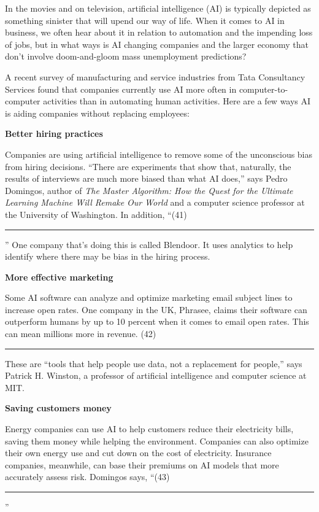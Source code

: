 \documentclass[UTF8,11pt]{ctexart}
\begin{document}
In the movies and on television, artificial intelligence (AI) is typically depicted as something sinister that will upend our way of life. When it comes to AI in business, we often hear about it in relation to automation and the impending loss of jobs, but in what ways is AI changing companies and the larger economy that don’t involve doom-and-gloom mass unemployment predictions?


A recent survey of manufacturing and service industries from Tata Consultancy Services found that companies currently use AI more often in computer-to-computer activities than in automating human activities. Here are a few ways AI is aiding companies without replacing employees:


\textbf{Better hiring practices}


Companies are using artificial intelligence to remove some of the unconscious bias from hiring decisions. “There are experiments that show that, naturally, the results of interviews are much more biased than what AI does,” says Pedro Domingos, author of \textit{The Master Algorithm: How the Quest for the Ultimate Learning Machine Will Remake} \textit{Our World} and a computer science professor at the University of Washington. In addition, “(41)\par\noindent\rule{.95\linewidth}{.4pt}\par ” One company that’s doing this is called Blendoor. It uses analytics to help identify where there may be bias in the hiring process.


\textbf{More effective marketing}


Some AI software can analyze and optimize marketing email subject lines to increase open rates. One company in the UK, Phrasee, claims their software can outperform humans by up to 10 percent when it comes to email open rates. This can mean millions more in revenue. (42)\par\noindent\rule{.95\linewidth}{.4pt}\par  These are “tools that help people use data, not a replacement for people,” says Patrick H. Winston, a professor of artificial intelligence and computer science at MIT.


\textbf{Saving customers money}


Energy companies can use AI to help customers reduce their electricity bills, saving them money while helping the environment. Companies can also optimize their own energy use and cut down on the cost of electricity. Insurance companies, meanwhile, can base their premiums on AI models that more accurately assess risk. Domingos says, “(43)\par\noindent\rule{.95\linewidth}{.4pt}\par ”
\end{document}
